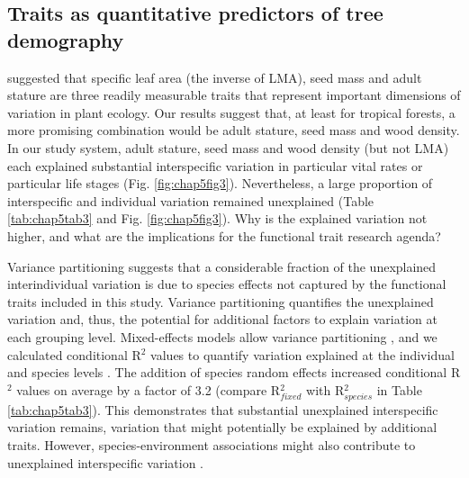 \documentclass[b5paper,justified]{tufte-book} %
\begin{document}
\begin{fullwidth}
\subsection{Traits as quantitative predictors of tree demography}
\citet{Westoby1998} suggested that specific leaf area (the inverse of LMA), seed mass and adult stature are three
readily measurable traits that represent important dimensions of variation in plant ecology. Our results suggest
that, at least for tropical forests, a more promising combination would be adult stature, seed mass and wood density. In our study system, adult stature, seed mass and wood density (but not LMA) each explained substantial
interspecific variation in particular vital rates or particular life stages (Fig. \ref{fig:chap5fig3}). Nevertheless, a large proportion of interspecific and individual variation remained unexplained (Table \ref{tab:chap5tab3} and Fig. \ref{fig:chap5fig3}). Why is the explained variation not higher, and what are the implications for the functional
trait research agenda?

Variance partitioning suggests that a considerable fraction of the unexplained interindividual variation is due to species effects not captured by the functional traits included in this study. Variance partitioning quantifies the unexplained variation and, thus, the potential for additional factors to explain variation at each grouping level. Mixed-effects models allow variance partitioning \citep{Bolker2009}, and we calculated conditional R$^2$ values to quantify variation explained at the individual and species levels \citep{Nakagawa2013}. The addition of species random effects increased conditional R$^2$ values on average by a factor of 3.2 (compare R$^2_{fixed}$ with R$^2_{species}$ in Table \ref{tab:chap5tab3}). This demonstrates that substantial unexplained interspecific variation remains, variation that might potentially be explained by additional traits. However, species-environment associations might also contribute to unexplained interspecific variation \citep{Messier2010, Lasky2013}.


\end{fullwidth}
\end{document}
